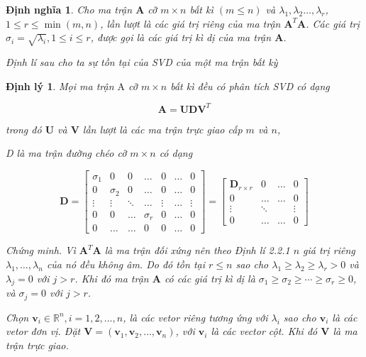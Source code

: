 \documentclass[12pt,a4paper,oneside]{report}
\newtheorem{dl}{Định lý}[section]
\newtheorem{dn}{Định nghĩa}[section]
\numberwithin{equation}{section}
\begin{document}
\begin{dn}\rm Cho ma trận $\mathbf{A}$ cỡ $m \times n$ bất kì $(m \leqslant n)$ và $\lambda_{1}, \lambda_{2} \ldots, \lambda_{r}$, $1 \leqslant r \leqslant \min (m, n)$, lần lượt là các giá trị riêng của ma trận $\mathbf{A}^{T} \mathbf{A}$. Các giá trị $\sigma_{i}=\sqrt{\lambda_{i}}, 1 \leqslant i \leqslant r$, được gọi là các giá trị kì dị của ma trận $\mathbf{A}$.

Định lí sau cho ta sự tồn tại của SVD của một ma trận bất kỳ
\end{dn}

\begin{dl}Mọi ma trận $\mathrm{A}$ cỡ $m \times n$ bất kì đều có phân tích SVD có dạng

$$
\mathbf{A}=\mathbf{U D V}^{T}
$$

trong đó $\mathbf{U}$ và $\mathbf{V}$ lần lượt là các ma trận trực giao cấp $m$ và $n$,

D là ma trận đường chéo cỡ $m \times n$ có dạng

$$
\mathbf{D}=\left[\begin{array}{ccccccc}
	\sigma_{1} & 0 & 0 & \ldots & 0 & \ldots & 0 \\
	0 & \sigma_{2} & 0 & \ldots & 0 & \ldots & 0 \\
	\vdots & \vdots & \ddots & \ldots & \vdots & \ldots & \vdots \\
	0 & 0 & \ldots & \sigma_{r} & 0 & \ldots & 0 \\
	0 & \ldots & \ldots & 0 & 0 & \ldots & 0
\end{array}\right]=\left[\begin{array}{cccc}
	\mathbf{D}_{r \times r} & 0 & \ldots & 0 \\
	0 & \ldots & \ldots & 0 \\
	\vdots & \ddots & & \vdots \\
	0 & \ldots & \ldots & 0
\end{array}\right]
$$

Chứng minh. Vì $\mathbf{A}^{T} \mathbf{A}$ là ma trận đối xứng nên theo Định lí 2.2.1 $n$ giá trị riêng $\lambda_{1}, \ldots, \lambda_{n}$ của nó đều không âm. Do đó tồn tại $r \leqslant n$ sao cho $\lambda_{1} \geqslant \lambda_{2} \geqslant \lambda_{r}>0$ và $\lambda_{j}=0$ với $j>r$. Khi đó ma trận $\mathbf{A}$ có các giá trị kì dị là $\sigma_{1} \geqslant \sigma_{2} \geqslant \cdots \geqslant \sigma_{r} \geqslant 0$, và $\sigma_{j}=0$ với $j>r$.

Chọn $\mathbf{v}_{i} \in \mathbb{R}^{n}, i=1,2, \ldots, n$, là các vetor riêng tương ứng với $\lambda_{i}$ sao cho $\mathbf{v}_{i}$ là các vetor đơn vị. Đặt $\mathbf{V}=\left(\mathbf{v}_{1}, \mathbf{v}_{2}, \ldots, \mathbf{v}_{n}\right)$, với $\mathbf{v}_{i}$ là các vector cột. Khi đó $\mathbf{V}$ là ma trận trực giao.


\end{dl}
\end{document}
